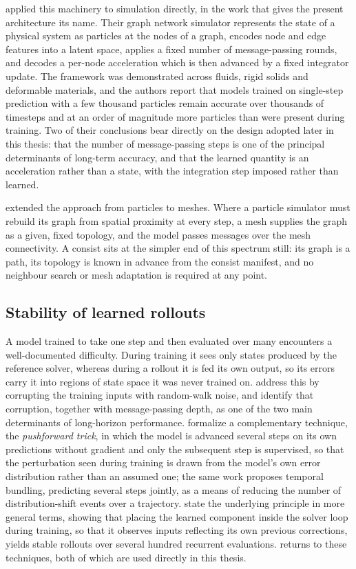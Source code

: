 \cite{sanchez2020gns} applied this machinery to simulation directly, in the work that gives the present architecture its name. Their graph network simulator represents the state of a physical system as particles at the nodes of a graph, encodes node and edge features into a latent space, applies a fixed number of message-passing rounds, and decodes a per-node acceleration which is then advanced by a fixed integrator update. The framework was demonstrated across fluids, rigid solids and deformable materials, and the authors report that models trained on single-step prediction with a few thousand particles remain accurate over thousands of timesteps and at an order of magnitude more particles than were present during training. Two of their conclusions bear directly on the design adopted later in this thesis: that the number of message-passing steps is one of the principal determinants of long-term accuracy, and that the learned quantity is an acceleration rather than a state, with the integration step imposed rather than learned.

\cite{pfaff2021meshgraphnets} extended the approach from particles to meshes. Where a particle simulator must rebuild its graph from spatial proximity at every step, a mesh supplies the graph as a given, fixed topology, and the model passes messages over the mesh connectivity. A consist sits at the simpler end of this spectrum still: its graph is a path, its topology is known in advance from the consist manifest, and no neighbour search or mesh adaptation is required at any point.

\subsection{Stability of learned rollouts}
\label{sec:graph_rollout_stability}

A model trained to take one step and then evaluated over many encounters a well-documented difficulty. During training it sees only states produced by the reference solver, whereas during a rollout it is fed its own output, so its errors carry it into regions of state space it was never trained on. \cite{sanchez2020gns} address this by corrupting the training inputs with random-walk noise, and identify that corruption, together with message-passing depth, as one of the two main determinants of long-horizon performance. \cite{brandstetter2022mppde} formalize a complementary technique, the \emph{pushforward trick}, in which the model is advanced several steps on its own predictions without gradient and only the subsequent step is supervised, so that the perturbation seen during training is drawn from the model's own error distribution rather than an assumed one; the same work proposes temporal bundling, predicting several steps jointly, as a means of reducing the number of distribution-shift events over a trajectory. \cite{um2020solverintheloop} state the underlying principle in more general terms, showing that placing the learned component inside the solver loop during training, so that it observes inputs reflecting its own previous corrections, yields stable rollouts over several hundred recurrent evaluations.
 returns to these techniques, both of which are used directly in this thesis.

